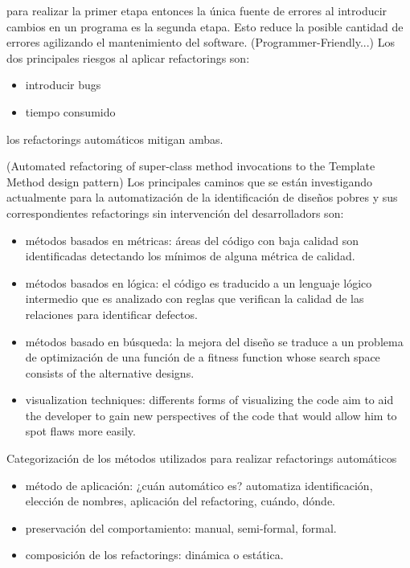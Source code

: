 para realizar la primer etapa entonces la única fuente de errores al introducir cambios en un
programa es la segunda etapa. Esto reduce la posible cantidad de errores agilizando el mantenimiento
del software.
(Programmer-Friendly...) Los dos principales riesgos al aplicar refactorings son:

\begin{itemize}
    \item introducir bugs
    \item tiempo consumido
\end{itemize}

los refactorings automáticos mitigan ambas.

(Automated refactoring of super-class method invocations to the Template Method design pattern) Los
principales caminos que se están investigando actualmente para la automatización de la
identificación de diseños pobres y sus correspondientes refactorings sin intervención del
desarrolladors son:

\begin{itemize}
    \item métodos basados en métricas: áreas del código con baja calidad son identificadas detectando
    los mínimos de alguna métrica de calidad.
    \item métodos basados en lógica: el código es traducido a un lenguaje lógico intermedio que es analizado
    con reglas que verifican la calidad de las relaciones para identificar defectos.
    \item métodos basado en búsqueda: la mejora del diseño se traduce a un problema de optimización de una función de 
    a fitness function whose search space consists of the alternative designs.
    \item visualization techniques: differents forms of visualizing the code aim to aid the
    developer to gain new perspectives of the code that would allow him to spot flaws more easily.
\end{itemize}

Categorización de los métodos utilizados para realizar refactorings automáticos

\begin{itemize}
    \item método de aplicación: ¿cuán automático es? automatiza identificación, elección de nombres, aplicación del refactoring, cuándo, dónde.
    \item preservación del comportamiento: manual, semi-formal, formal.
    \item composición de los refactorings: dinámica o estática.
\end{itemize}

